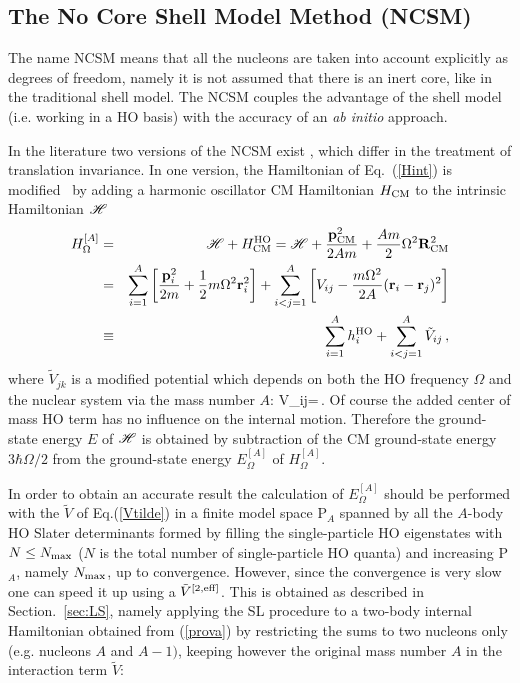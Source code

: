 \subsection {The No Core Shell Model Method (NCSM)}\label{sec:NCSM}
The name NCSM means that all the nucleons  are taken into
account  explicitly as degrees of freedom, namely  it is not assumed that there is an inert core, like in the traditional shell model. 
The NCSM couples the  advantage of the shell model (i.e. working in a HO basis) with the accuracy of an {\it ab initio} approach.  

In the literature two versions of the NCSM exist , which differ in the treatment of translation invariance.
In one version, the Hamiltonian of Eq.~(\ref{Hint})
is modified~\cite{ShF74} by adding a harmonic oscillator CM Hamiltonian $H_{\rm CM}$ to the intrinsic Hamiltonian $\cal H$
 \begin{eqnarray}
H^{[A]}_\Omega &=& {\cal H} + H_{\rm CM}^{\rm HO} = {\cal H} +  \frac {\mathbf{p}_{\rm \rm CM}^2} {2Am} + 
{\frac{Am}{2}} \Omega^2 {\bf R}_{\rm CM}^2 \\
\label{prova}
 &=& \sum_{i=1}^A \left[ {\frac{{\bf p}_i^2}{2m}}
+\frac{1}{2}m\Omega^2 {\bf r}^2_i
\right] + \sum_{i<j=1}^A \left[ V_{ij}
-\frac{m\Omega^2}{2A}
({\bf r}_i-{\bf r}_j)^2 
\right]\\
&\equiv& \sum_{i=1}^A h_i^{\rm HO} + \sum_{i<j=1}^A\tilde V_{ij} \,,
\label{HOmega}
\end{eqnarray}
where $\tilde V_{jk}$ is a modified potential which depends  on  both the HO frequency $\Omega$ and the nuclear 
system via the mass number $A$: 
\be
\label{Vtilde}
\tilde V_{ij}=\,.
\ee
Of course the added center of mass HO term has no influence on the internal motion. 
Therefore the ground-state energy $E$ of ${\cal H}$ is obtained
by subtraction of the CM ground-state energy $3\hbar \Omega/2$ from the ground-state energy 
$E^{[A]}_\Omega$ of $H^{[A]}_\Omega$. 

In order to obtain an accurate result the calculation of $E^{[A]}_\Omega$  should be  performed with the $\tilde V$ of Eq.(\ref{Vtilde})
in a finite model space  P${\!_A}$ spanned
by all the $A$-body HO Slater determinants formed by filling the single-particle HO eigenstates
with $N\leq N_{\rm max}$ ($N$ is the total number of single-particle HO quanta) and increasing  
P${\!_A}$, namely $N_{\rm max}$, up to convergence. However, since the convergence is very slow one can speed it up
using a $\tilde V^{\rm [2,eff]}$. This is obtained as described in Section.~\ref{sec:LS}, namely applying the SL procedure
to a two-body internal Hamiltonian obtained from (\ref{prova}) 
by restricting the sums to two nucleons only (e.g. nucleons $A$ and $A-1)$, keeping however the original mass number $A$ 
in the interaction term $\tilde V$:

